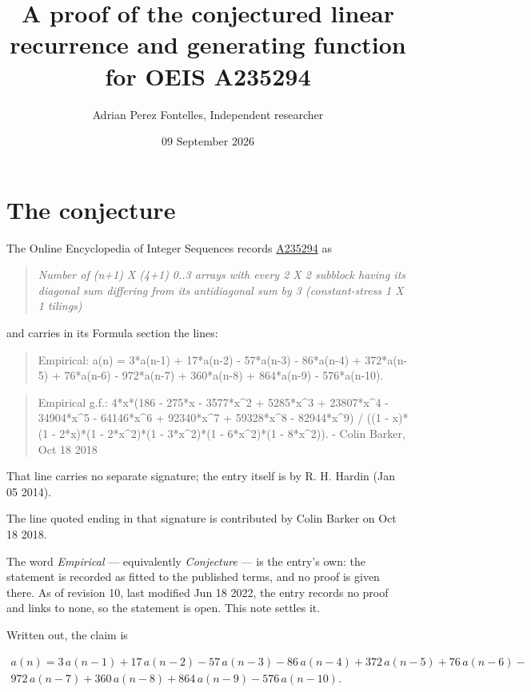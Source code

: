 \documentclass[11pt]{article}
\title{A proof of the conjectured linear recurrence and generating function for OEIS A235294}
\author{Adrian Perez Fontelles, Independent researcher}
\date{09 September 2026}
\theoremstyle{definition}
\begin{document}
\maketitle
\section{The conjecture}

The Online Encyclopedia of Integer Sequences records \href{https://oeis.org/A235294}{A235294} as

\begin{quote}\itshape Number of (n+1) X (4+1) 0..3 arrays with every 2 X 2 subblock having its diagonal sum differing from its antidiagonal sum by 3 (constant-stress 1 X 1 tilings)\end{quote}

and carries in its Formula section the lines:

\begin{quote}\ttfamily Empirical: a(n) = 3*a(n-1) + 17*a(n-2) - 57*a(n-3) - 86*a(n-4) + 372*a(n-5) + 76*a(n-6) - 972*a(n-7) + 360*a(n-8) + 864*a(n-9) - 576*a(n-10).\end{quote}

\begin{quote}\ttfamily Empirical g.f.: 4*x*(186 - 275*x - 3577*x\textasciicircum{}2 + 5285*x\textasciicircum{}3 + 23807*x\textasciicircum{}4 - 34904*x\textasciicircum{}5 - 64146*x\textasciicircum{}6 + 92340*x\textasciicircum{}7 + 59328*x\textasciicircum{}8 - 82944*x\textasciicircum{}9) / ((1 - x)*(1 - 2*x)*(1 - 2*x\textasciicircum{}2)*(1 - 3*x\textasciicircum{}2)*(1 - 6*x\textasciicircum{}2)*(1 - 8*x\textasciicircum{}2)). - Colin Barker, Oct 18 2018\end{quote}

That line carries no separate signature; the entry itself is by R. H. Hardin (Jan 05 2014).

The line quoted ending in that signature is contributed by Colin Barker on Oct 18 2018.

The word {\itshape Empirical} --- equivalently {\itshape Conjecture} --- is the entry's own: the statement is recorded as fitted to the published terms, and no proof is given there. As of revision 10, last modified Jun 18 2022, the entry records no proof and links to none, so the statement is open. This note settles it.

Written out, the claim is

\begin{multline*} a(n) = 3\,a(n-1) + 17\,a(n-2) - 57\,a(n-3) - 86\,a(n-4) + 372\,a(n-5) + 76\,a(n-6) - \\ 972\,a(n-7) + 360\,a(n-8) + 864\,a(n-9) - 576\,a(n-10). \end{multline*}
\end{document}

